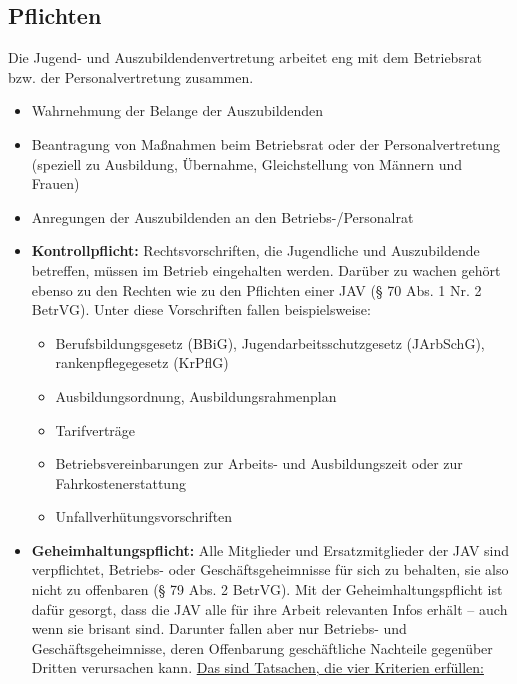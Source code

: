 \subsection{Pflichten}
{
Die Jugend- und Auszubildendenvertretung arbeitet eng mit dem Betriebsrat bzw. der Personalvertretung zusammen. 
}
\newline
\begin{itemize}
	\item  
	Wahrnehmung der Belange der Auszubildenden
	\item
	Beantragung von Maßnahmen beim Betriebsrat oder der Personalvertretung (speziell zu Ausbildung, Übernahme, Gleichstellung von Männern und Frauen)
	\item
	Anregungen der Auszubildenden an den Betriebs-/Personalrat
	\item
	\textbf{Kontrollpflicht:}
	\newline
	{
		Rechtsvorschriften, die Jugendliche und Auszubildende betreffen, müssen im Betrieb eingehalten werden. \newline 
		Darüber zu wachen gehört ebenso zu den Rechten wie zu den Pflichten einer JAV (§ 70 Abs. 1 Nr. 2 BetrVG). Unter diese Vorschriften fallen beispielsweise:
	}
	\begin{itemize}
		\item 
		Berufsbildungsgesetz (BBiG), Jugendarbeitsschutzgesetz (JArbSchG), rankenpflegegesetz (KrPflG)
		\item
		Ausbildungsordnung, Ausbildungsrahmenplan
		\item
		Tarifverträge
		\item
		Betriebsvereinbarungen zur Arbeits- und Ausbildungszeit oder zur Fahrkostenerstattung
		\item
		Unfallverhütungsvorschriften
	\end{itemize}
	\item 
	\textbf{Geheimhaltungspflicht:}
	\newline
	{
		Alle Mitglieder und Ersatzmitglieder der JAV sind verpflichtet, Betriebs- oder Geschäftsgeheimnisse für sich zu behalten, sie also nicht zu offenbaren (§ 79 Abs. 2 BetrVG). Mit der Geheimhaltungspflicht ist dafür gesorgt, dass die JAV alle für ihre Arbeit relevanten Infos erhält – auch wenn sie brisant sind.
	 	\newline
	 	Darunter fallen aber nur Betriebs- und Geschäftsgeheimnisse, deren Offenbarung geschäftliche Nachteile gegenüber Dritten verursachen kann. \newline 
	 	\underline{Das sind Tatsachen, die vier Kriterien erfüllen:} 
}
\end{itemize}
